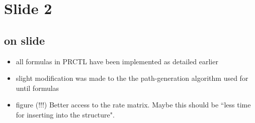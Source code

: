\documentclass[a4paper,12pt]{article}
\begin{document}
\section{Slide 2}
\subsection{on slide}
\begin{itemize}
	\item all formulas in PRCTL have been implemented as detailed earlier
	\item slight modification was made to the the path-generation algorithm used for until formulas
	\item figure (!!!) Better access to the rate matrix. Maybe this should be ``less time for inserting into the structure".
\end{itemize}
\end{document}
